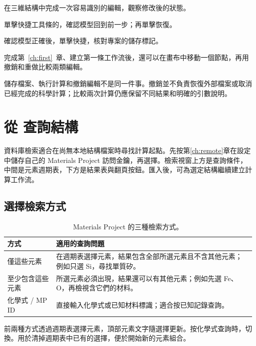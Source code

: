 \begin{steps}
\item 在三維結構中完成一次容易識別的編輯，觀察修改後的狀態。
\item 單擊快捷工具條的，確認模型回到前一步；再單擊恢復。
\item 確認模型正確後，單擊快捷，核對專案的儲存標記。
\end{steps}

完成第~\ref{ch:first}~章、建立第一條工作流後，還可以在畫布中移動一個節點，再用撤銷和重做比較兩類編輯。

儲存檔案、執行計算和撤銷編輯不是同一件事。撤銷並不負責恢復外部檔案或取消已經完成的科學計算；比較兩次計算仍應保留不同結果和明確的引數說明。

\section{從  查詢結構}\label{sec:mp-search}

資料庫檢索適合在尚無本地結構檔案時尋找計算起點。先按第\ref{ch:remote}章在設定中儲存自己的 Materials Project 訪問金鑰，再選擇。檢索視窗上方是查詢條件，中間是元素週期表，下方是結果表與翻頁按鈕。匯入後，可為選定結構繼續建立計算工作流。

\subsection{選擇檢索方式}

\begin{table}[htbp]
\centering
\caption{Materials Project 的三種檢索方式。}
\begin{tabularx}{\linewidth}{lX}
\toprule
方式 & 適用的查詢問題 \\
\midrule
僅這些元素 & 在週期表選擇元素，結果包含全部所選元素且不含其他元素；例如只選 Si，尋找單質矽。 \\
至少包含這些元素 & 所選元素必須出現，結果還可以有其他元素；例如先選 Fe、O，再檢視含它們的材料。 \\
化學式 / MP ID & 直接輸入化學式或已知材料標識；適合按已知記錄查詢。 \\
\bottomrule
\end{tabularx}
\end{table}

前兩種方式透過週期表選擇元素，頂部元素文字隨選擇更新。按化學式查詢時，切換。用於清掉週期表中已有的選擇，便於開始新的元素組合。

